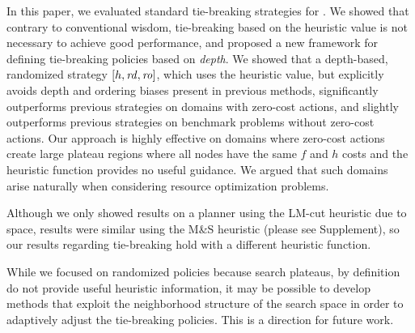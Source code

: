 In this paper, we evaluated standard tie-breaking
strategies for \astar.
We showed that contrary to conventional wisdom, tie-breaking based on the heuristic value is not necessary to achieve good performance, and proposed
a new framework for defining tie-breaking policies based on \emph{depth}.
We showed that a depth-based, randomized strategy $[h,\mbox{\textit{rd}},\mbox{\textit{ro}}]$, which uses the heuristic value, but explicitly avoids depth and ordering biases present in previous methods,
significantly outperforms previous strategies on domains with zero-cost actions, 
and slightly outperforms previous strategies on benchmark problems without zero-cost actions.
Our approach is highly effective on domains where zero-cost actions create large plateau regions where all nodes have the same $f$ and $h$ costs
and the heuristic function provides no useful guidance.
We argued that such domains arise naturally when considering resource optimization problems.


Although we only showed results on a planner using the LM-cut heuristic due to space, 
results were similar using the M\&S heuristic  (please see Supplement), so our results regarding tie-breaking hold with a different heuristic function.




While we focused on randomized policies because search plateaus, by definition do not provide useful heuristic information,
it may be possible to develop methods that exploit the neighborhood structure of the search space
in order to adaptively adjust the tie-breaking policies. This is a direction for future work.




